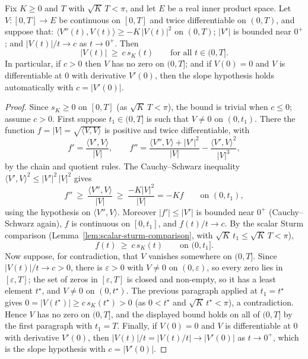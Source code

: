 \begin{lemma}
\label{lem:vector-sturm-comparison}
\leanok
Fix $K\ge0$ and $T$ with $\sqrt K\,T<\pi$, and let $E$ be a real
inner product space. Let $V\colon[0,T]\to E$ be continuous on
$[0,T]$ and twice differentiable on $(0,T)$, and suppose that:
$\langle V''(t),V(t)\rangle\ge-K\,|V(t)|^2$ on $(0,T)$; $|V'|$ is
bounded near $0^+$; and $|V(t)|/t\to c$ as $t\to0^+$. Then
$$|V(t)|\ \ge\ c\,s_K(t)\qquad\text{for all }t\in(0,T].$$
In particular, if $c>0$ then $V$ has no zero on $(0,T]$; and if
$V(0)=0$ and $V$ is differentiable at $0$ with derivative $V'(0)$,
then the slope hypothesis holds automatically with $c=|V'(0)|$.
\end{lemma}

\begin{proof}
\leanok
Since $s_K\ge0$ on $[0,T]$ (as $\sqrt K\,T<\pi$), the bound is
trivial when $c\le0$; assume $c>0$. First suppose $t_1\in(0,T]$ is
such that $V\not=0$ on $(0,t_1)$. There the function
$f=|V|=\sqrt{\langle V,V\rangle}$ is positive and twice
differentiable, with
$$f'=\frac{\langle V',V\rangle}{|V|},\qquad
f''=\frac{\langle V'',V\rangle+|V'|^2}{|V|}
-\frac{\langle V',V\rangle^2}{|V|^3},$$
by the chain and quotient rules. The Cauchy--Schwarz inequality
$\langle V',V\rangle^2\le|V'|^2\,|V|^2$ gives
$$f''\ \ge\ \frac{\langle V'',V\rangle}{|V|}\ \ge\
\frac{-K|V|^2}{|V|}=-K f\qquad\text{on }(0,t_1),$$
using the hypothesis on $\langle V'',V\rangle$. Moreover
$|f'|\le|V'|$ is bounded near $0^+$ (Cauchy--Schwarz again), $f$ is
continuous on $[0,t_1]$, and $f(t)/t\to c$. By the scalar Sturm
comparison (Lemma~\ref{lem:scalar-sturm-comparison}, with
$\sqrt K\,t_1\le\sqrt K\,T<\pi$),
$$f(t)\ \ge\ c\,s_K(t)\qquad\text{on }(0,t_1].$$
Now suppose, for contradiction, that $V$ vanishes somewhere on
$(0,T]$. Since $|V(t)|/t\to c>0$, there is $\varepsilon>0$ with
$V\not=0$ on $(0,\varepsilon)$, so every zero lies in
$[\varepsilon,T]$; the set of zeros in $[\varepsilon,T]$ is closed
and non-empty, so it has a least element $t^\star$, and
$V\not=0$ on $(0,t^\star)$. The previous paragraph applied at
$t_1=t^\star$ gives $0=|V(t^\star)|\ge c\,s_K(t^\star)>0$ (as
$0<t^\star$ and $\sqrt K\,t^\star<\pi$), a contradiction. Hence $V$
has no zero on $(0,T]$, and the displayed bound holds on all of
$(0,T]$ by the first paragraph with $t_1=T$. Finally, if $V(0)=0$
and $V$ is differentiable at $0$ with derivative $V'(0)$, then
$|V(t)|/t=|V(t)/t|\to|V'(0)|$ as $t\to0^+$, which is the slope
hypothesis with $c=|V'(0)|$.
\end{proof}

